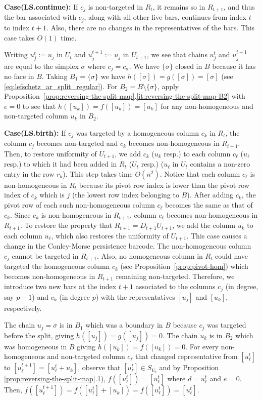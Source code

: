 \documentclass[letterpaper,11pt]{article}
\theoremstyle{plain}
\theoremstyle{definition}
\newcounter{li}
\begin{document}
\textbf{Case(LS.continue):} If $c_j$ is non-targeted in $R_t$, it remains so in $R_{t+1}$, 
    and thus the bar associated with $c_j$, along with all other live bars, continues
    from index $t$ to index $t+1$. 
Also, there are no changes in the representatives of the bars. This case takes
$O(1)$ time.

Writing $u_j^t:=u_j$ in $U_t$ and $u_j^{t+1}:=u_j$
in $U_{t+1}$, we see that chains $u_j^t$ and $u^{t+1}_j$ are equal to the simplex $\sigma$ where
$c_j=c_\sigma$. We have $\{\sigma\}$ closed in $B$ because
it has no face in $B$. 
Taking $B_1=\{\sigma\}$ we have $h([\sigma])=g([\sigma])=[\sigma]$ (see \eqref{eq:lefschetz_ar_split_regular}). 
For $B_2=B\setminus \{\sigma\}$, apply Proposition~\ref{prop:reversing-the-split-map}.\ref{it:reversing-the-split-map-B2} with
$e=0$ to see that $h([u_k])=f([u_k])=[u_k]$ for any non-homogeneous
and non-targeted column $u_k$ in $B_2$.

\textbf{Case(LS.birth):} If $c_j$ was targeted by a homogeneous column $c_k$ in $R_t$, the column $c_j$ becomes non-targeted and $c_k$ becomes non-homogeneous in $R_{t+1}$. Then, to restore
uniformity of $U_{t+1}$, we add $c_k$ ($u_k$ resp.) to each column $c_\ell$ ($u_\ell$ resp.) to which it had been added in $R_t$ ($U_t$ resp.) ($u_\ell$ in $U_t$ contains a non-zero entry in the row $r_k$). 
This step takes time $O(n^2)$. Notice that each column $c_\ell$
is non-homogeneous in $R_t$ because its pivot row index is lower
than the pivot row index of $c_k$ which is $j$ (the lowest row index belonging to $B$). 
After adding $c_k$, the pivot row of each such non-homogeneous column $c_\ell$ becomes the same as that of $c_k$. 
Since $c_k$ is non-homogeneous in $R_{t+1}$, column $c_\ell$ becomes non-homogeneous in $R_{t+1}$. 
To restore the property that $R_{t+1}=D_{t+1}U_{t+1}$, we add the column $u_k$ to each column $u_\ell$, which also restores the uniformity of $U_{t+1}$. 
This case causes a change in the Conley-Morse persistence barcode. The non-homogeneous column $c_j$ cannot be targeted in $R_{t+1}$. Also, no homogeneous column
in $R_t$ could have targeted the homogeneous column $c_k$ (see Proposition~\ref{prop:pivot-hom}) which becomes non-homogeneous in $R_{t+1}$ remaining non-targeted.
Therefore, we introduce two new bars at the index $t+1$ associated to the columns $c_j$ (in degree, say $p-1$) and $c_k$ (in degree $p$) with the representatives
$[u_j]$ and $[u_k]$, respectively. 

The chain $u_j=\sigma$ is in $B_1$ which was a boundary in $B$ because
$c_j$ was targeted before the split,
giving
$h([u_j])=g([u_j])=0$. The chain $u_k$ is in $B_2$ which was homogeneous in $B$ giving $h([u_k])=f([u_k])=0$. 
For every non-homogeneous and non-targeted column $c_\ell$ that changed
representative from $[u^t_\ell]$ to $[u^{t+1}_\ell]=[u^t_\ell+u_k]$,
observe that $[u^t_\ell]\in S_{V_2}$ and by Proposition \ref{prop:reversing-the-split-map}.1), $f([u^t_\ell])=[u^t_\ell]$ where $d=u^t_\ell$ and $e=0$. 
Then, $f([u^{t+1}_\ell])=f([u^t_\ell]+[u_k])=f([u^t_\ell])=[u^t_\ell]$.
\end{document}
